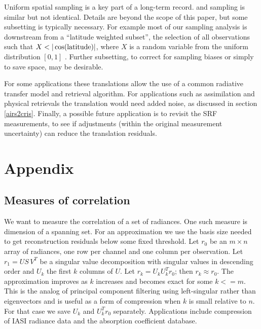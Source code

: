 \documentclass[journal]{IEEEtran}
\begin{document}
Uniform spatial sampling is a key part of a long-term record.
{\airs} and {\cris} sampling is similar but not identical.  Details
are beyond the scope of this paper, but some subsetting is typically
necessary.  For example most of our sampling analysis is downstream
from a ``latitude weighted subset'', the selection of all
observations such that $X < |\cos(\hbox{latitude})|$, where $X$ is a
random variable from the uniform distribution $[0, 1]$
\cite{git:acsamp}.  Further subsetting, to correct for sampling
biases or simply to save space, may be desirable.

For some applications these translations allow the use of a common
radiative transfer model and retrieval algorithm.  For applications
such as assimilation and physical retrievals the translation would
need added noise, as discussed in section \ref{airs2cris}.  Finally,
a possible future application is to revisit the {\airs} SRF
measurements, to see if adjustments (within the original measurement
uncertainty) can reduce the translation residuals.


\section{Appendix}
\label{append}

\subsection{Measures of correlation}

We want to measure the correlation of a set of radiances.  One such
measure is dimension of a spanning set.  For an approximation we use
the basis size needed to get reconstruction residuals below some
fixed threshold.  Let $r_0$ be an $m \times n$ array of radiances,
one row per channel and one column per observation.  Let $r_1 = U
S\,V^T$ be a singular value decomposition with singular values in
descending order and $U_k$ the first $k$ columns of $U$.  Let $r_k =
U_k U_k^T r_0$; then $r_k \approx r_0$.  The approximation improves
as $k$ increases and becomes exact for some $k <= m$.  This is the
analog of principal component filtering using left-singular rather
than eigenvectors and is useful as a form of compression when $k$ is
small relative to $n$.  For that case we save $U_k$ and $U_k^T r_0$
separately.  Applications include compression of IASI radiance data
and the {\kcarta} absorption coefficient database.
\end{document}
